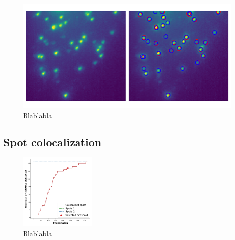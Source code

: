 \begin{figure}[h]
    \centering
    \includegraphics[width=1\textwidth]{figures/chapter2/subpixel_fitting}
    \caption{Blablabla}
    \label{fig:subpixel_fitting}
\end{figure}



\subsection{Spot colocalization}


\begin{figure}
  \begin{center}
    \includegraphics[width=0.33\textwidth]{figures/chapter2/colocalization_elbow}
  \end{center}
  \caption{Blablabla}
  \label{fig:elbow_colocalization}
\end{figure}


